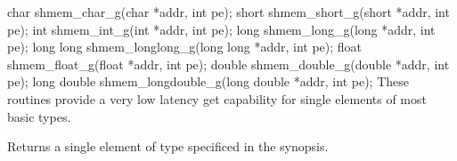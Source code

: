 \synC   %

 char shmem_char_g(char *addr, int pe);
 short shmem_short_g(short *addr, int pe);
 int shmem_int_g(int *addr, int pe);
 long shmem_long_g(long *addr, int pe);
 long long  shmem_longlong_g(long long *addr, int pe);
 float shmem_float_g(float *addr, int pe);
 double shmem_double_g(double *addr, int pe);
 long double shmem_longdouble_g(long double *addr, int pe);
{
  These  routines	provide	 a  very low latency get capability for single elements of most basic types. 
}

{
      {Returns a single element of type specificed in the synopsis.}
}

{
}
\eAPI

       
       
       
       






